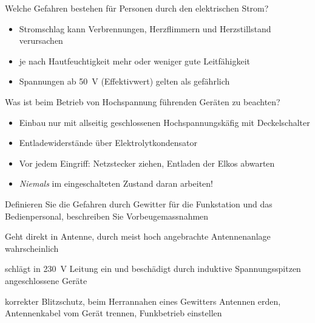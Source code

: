 \documentclass[avery5371,grid,frame,a4paper]{flashcards}
\newcommand{\card}[3]{
  \begin{flashcard}[{\chap} -- #1]{#2}#3\end{flashcard}
}
\newcommand\class[1]{{\footnotesize [Klassen: #1]}}
\begin{document}
\card{103}{Welche Gefahren bestehen für Personen durch den elektrischen Strom?}{
  \begin{itemize}
    \item Stromschlag kann Verbrennungen, Herzflimmern und Herzstillstand verursachen
    \item je nach Hautfeuchtigkeit mehr oder weniger gute Leitfähigkeit
    \item Spannungen ab \SI{50}{\volt} (Effektivwert) gelten als gefährlich
  \end{itemize}
}
\card{104}{Was ist beim Betrieb von Hochspannung führenden Geräten zu beachten?}{
  \begin{itemize}
    \item Einbau nur mit allseitig geschlossenen Hochspannungskäfig mit Deckelschalter
    \item Entladewiderstände über Elektrolytkondensator
    \item Vor jedem Eingriff: Netzstecker ziehen, Entladen der Elkos abwarten
    \item \emph{Niemals} im eingeschalteten Zustand daran arbeiten!
  \end{itemize}
}
\card{105}{Definieren Sie die Gefahren durch Gewitter für die Funkstation und das Bedienpersonal, beschreiben Sie Vorbeugemassnahmen}{
  \begin{description}\itemsep0pt
    \item[Primärblitzschlags] Geht direkt in Antenne, durch meist hoch angebrachte Antennenanlage wahrscheinlich
    \item[Sekundärblitzschlag] schlägt in \SI{230}{\volt} Leitung ein und beschädigt durch induktive Spannungsspitzen angeschlossene Geräte
    \item[Vorbeugungsmaßnahmen] korrekter Blitzschutz, beim Herrannahen eines Gewitters Antennen erden, Antennenkabel vom Gerät trennen, Funkbetrieb einstellen
  \end{description}
}

\def\chap{Technische Grundlagen \class{3,4}}
\end{document}
